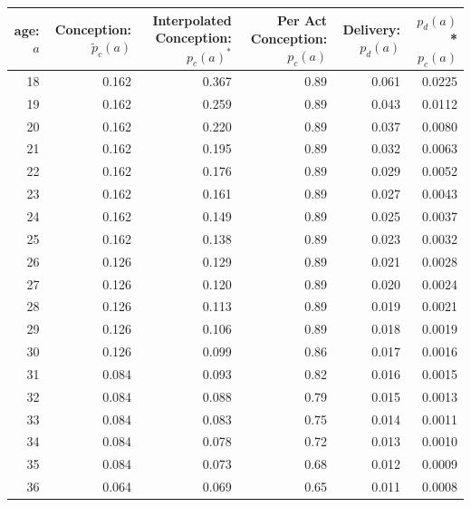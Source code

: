 \documentclass[11pt]{nih_mod}
\begin{document}
\begin{table} [H]
\begin{center}
  \colorbox{ECback}{
\begin{tabular}{|r|r|r|r|r|r|}
\hline
 {\bf {\footnotesize age:} $a$} &  {\bf {\footnotesize Conception:} $\tilde{p}_ c(a)$} & {\bf {\footnotesize Interpolated Conception:} $p_c(a)^*$} & {\bf {\footnotesize Per Act Conception:} $p_c(a)$} & {\bf {\footnotesize Delivery:} $p_d(a)$} & {\bf $p_d(a)$ * $p_c(a)$}\\
\hline
        18 &       0.162  &  0.367 & 0.89 &  0.061 & 0.0225\\
\hline
        19 &       0.162 &  0.259 & 0.89 & 0.043 & 0.0112\\
\hline
        20 &       0.162 & 0.220 & 0.89 & 0.037 & 0.0080\\
\hline
        21 &      0.162 & 0.195 & 0.89 & 0.032 & 0.0063\\
\hline
        22 &        0.162 & 0.176 & 0.89 & 0.029 & 0.0052\\
\hline
        23 &        0.162 & 0.161 & 0.89 & 0.027 & 0.0043\\
\hline
        24 &       0.162 & 0.149 & 0.89 & 0.025 & 0.0037\\
\hline
        25 &        0.162 & 0.138 & 0.89 & 0.023 &0.0032\\
\hline
        26 &      0.126 & 0.129 & 0.89 & 0.021 & 0.0028\\
\hline
        27 &       0.126 & 0.120 & 0.89 & 0.020& 0.0024\\
\hline
        28 &       0.126 & 0.113 & 0.89 & 0.019 & 0.0021\\
\hline
        29 &        0.126 & 0.106 & 0.89 & 0.018 & 0.0019\\
\hline
        30 &       0.126 & 0.099 & 0.86 & 0.017 & 0.0016\\
\hline
        31 &        0.084 & 0.093 & 0.82 & 0.016 & 0.0015\\
\hline
        32 &       0.084 & 0.088 & 0.79 & 0.015 & 0.0013\\
\hline
        33 &       0.084 & 0.083 & 0.75 & 0.014 & 0.0011\\
\hline
        34 &       0.084 & 0.078 & 0.72 & 0.013 & 0.0010\\
\hline
        35 &       0.084 & 0.073 & 0.68 & 0.012 & 0.0009\\
\hline
        36 &      0.064 & 0.069 & 0.65 & 0.011 & 0.0008\\

\end{tabular}}
\end{center}
\end{table}
\end{document}
